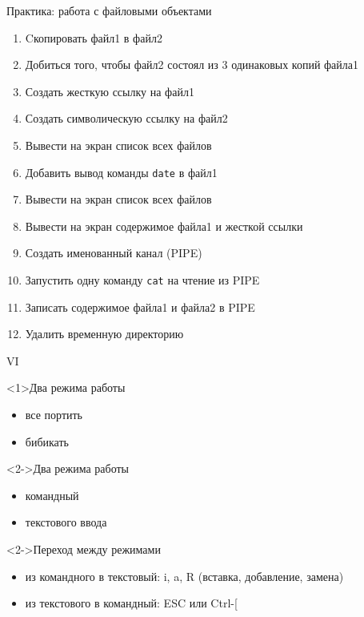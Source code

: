 \begin{frame}{Практика: работа с файловыми объектами}
	\begin{enumerate}
		\item Cкопировать файл1 в файл2
			\pause
		\item Добиться того, чтобы файл2 состоял из 3 одинаковых копий файла1
		\item Создать жесткую ссылку на файл1
		\item Создать символическую ссылку на файл2
		\item Вывести на экран список всех файлов
			\pause
		\item Добавить вывод команды {\tt date} в файл1
		\item Вывести на экран список всех файлов
		\item Вывести на экран содержимое файла1 и жесткой ссылки
		\item Создать именованный канал (PIPE)
		\item Запустить одну команду {\tt cat} на чтение из PIPE
		\item Записать содержимое файла1 и файла2 в PIPE
		\item Удалить временную директорию
	\end{enumerate}
\end{frame}

\begin{frame}{VI}
	\begin{block}{Два режима работы}
		\begin{itemize}
			\item все портить
			\item бибикать
		\end{itemize}
	\end{block}
	\pause
	\begin{block}<2->{Два режима работы}
		\begin{itemize}
			\item командный 
			\item текстового ввода
		\end{itemize}
	\end{block}

	\begin{block}<2->{Переход между режимами}
		\begin{itemize}
			\item из командного в текстовый: i, a, R (вставка, добавление, замена)
			\item из текстового в командный: ESC или Ctrl-[
		\end{itemize}
	\end{block}

\end{frame}

